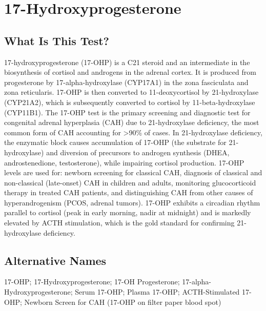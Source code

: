 \chapter{17-Hydroxyprogesterone}

\section*{What Is This Test?}
17-hydroxyprogesterone (17-OHP) is a C21 steroid and an intermediate in the biosynthesis of cortisol and androgens in the adrenal cortex. It is produced from progesterone by 17-alpha-hydroxylase (CYP17A1) in the zona fasciculata and zona reticularis. 17-OHP is then converted to 11-deoxycortisol by 21-hydroxylase (CYP21A2), which is subsequently converted to cortisol by 11-beta-hydroxylase (CYP11B1). The 17-OHP test is the primary screening and diagnostic test for congenital adrenal hyperplasia (CAH) due to 21-hydroxylase deficiency, the most common form of CAH accounting for >90\% of cases. In 21-hydroxylase deficiency, the enzymatic block causes accumulation of 17-OHP (the substrate for 21-hydroxylase) and diversion of precursors to androgen synthesis (DHEA, androstenedione, testosterone), while impairing cortisol production. 17-OHP levels are used for: newborn screening for classical CAH, diagnosis of classical and non-classical (late-onset) CAH in children and adults, monitoring glucocorticoid therapy in treated CAH patients, and distinguishing CAH from other causes of hyperandrogenism (PCOS, adrenal tumors). 17-OHP exhibits a circadian rhythm parallel to cortisol (peak in early morning, nadir at midnight) and is markedly elevated by ACTH stimulation, which is the gold standard for confirming 21-hydroxylase deficiency.

\section*{Alternative Names}
17-OHP; 17-Hydroxyprogesterone; 17-OH Progesterone; 17-alpha-Hydroxyprogesterone; Serum 17-OHP; Plasma 17-OHP; ACTH-Stimulated 17-OHP; Newborn Screen for CAH (17-OHP on filter paper blood spot)

